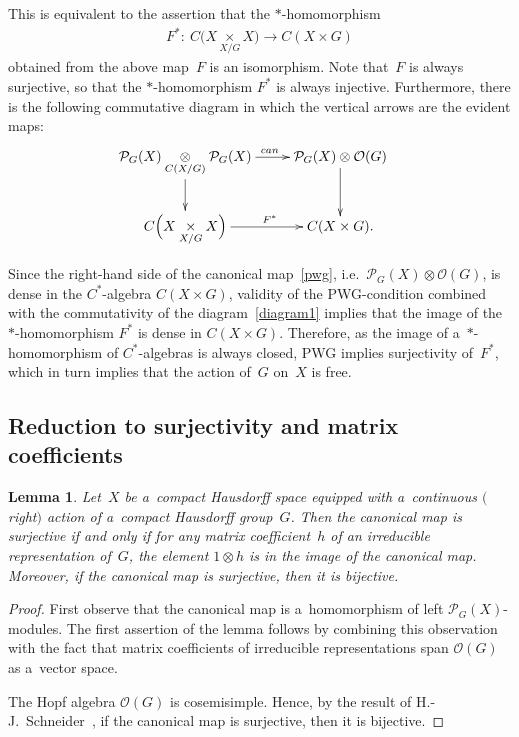 \documentclass[11pt]{article}
\newtheorem{lemma}{Lemma}
\begin{document}
This is equivalent to the assertion that the $*$-homomorphism
\begin{gather*}
F^{*}\colon \ C\Big(X\underset{X/G}{
\times
}X\Big)\longrightarrow C(X
\times
G)
\end{gather*}
obtained from the above map~$F$ is an isomorphism.
Note that~$F$ is always surjective, so that the $*$-homomorphism $F^{*}$ is always injective.
Furthermore, there is the following commutative diagram in which the vertical arrows are the evident maps:
\begin{gather}
\label{diagram1}
\begin{split}
& \xymatrix{
\mathcal{P}_{G}(X)\underset{C(X/G)}{\otimes}\mathcal{P}_{G}(X)\ar[r]^{\ \ \ {can}}\ar[d]^{}&
\mathcal{P}_{G}(X)\otimes{\mathcal O}(G)\ar[d]^{}
\\
C\Big(X\underset{X/G}{\times}X\Big)\ar[r]^{\ \ \ F^{*}}& C(X\times G).
}
\end{split}
\end{gather}

Since the right-hand side of the canonical map~\eqref{pwg}, i.e.\ $\mathcal{P}_G(X)\otimes \mathcal{O}(G)$, is dense in the $C^{*}$-algebra $C(X
\times
G)$, validity of the PWG-condition combined with the commutativity of the diagram~\eqref{diagram1} implies that the
image of the $*$-homomorphism $F^{*}$ is dense in $C(X
\times
G)$.
Therefore, as the image of a~$*$-homomorphism of $C^{*}$-algebras is always closed, PWG implies surjectivity of~$F^{*}$,
which in turn implies that the action of~$G$ on~$X$ is free.

\subsection{Reduction to surjectivity and matrix coef\/f\/icients}

\begin{lemma}\label{lemma}
Let~$X$ be a~compact Hausdorff space equipped with a~continuous $($right$)$ action of a~compact Hausdorff group~$G$.
Then the canonical map is surjective if and only if for any matrix coefficient~$h$ of an irreducible representation
of~$G$, the element $1\otimes h$ is in the image of the canonical map.
Moreover, if the canonical map is surjective, then it is bijective.
\end{lemma}

\begin{proof}
First observe that the canonical map is a~homomorphism of left $\mathcal{P}_{G}(X)$-modules.
The f\/irst assertion of the lemma follows by combining this observation with the fact that matrix coef\/f\/icients of
irreducible representations span ${\mathcal O}(G)$ as a~vector space.

The Hopf algebra ${\mathcal O}(G)$ is cosemisimple.
Hence, by the result of H.-J.~Schneider~\cite[Theorem~I]{s-hj90}, if the canonical map is surjective, then it is
bijective.
\end{proof}
\end{document}
